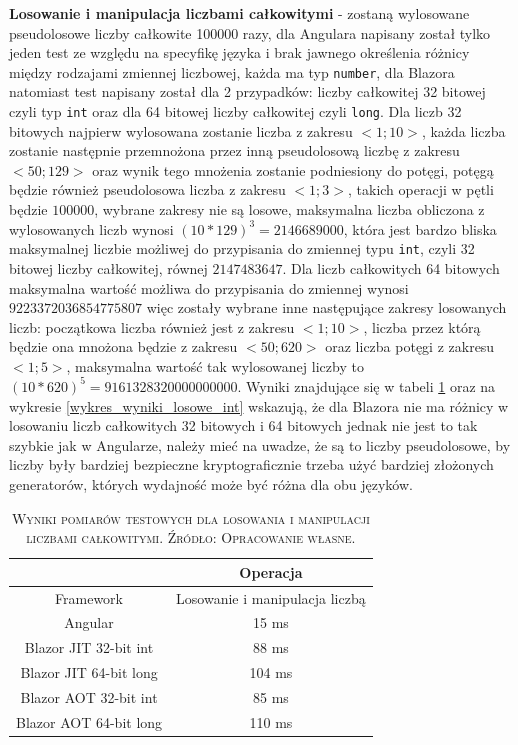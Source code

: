 \documentclass[12pt,a4paper,oneside]{book}
\newcommand{\captionT}[1]{\caption{\textsc{\footnotesize{#1}}}}
\begin{document}
\textbf{Losowanie i manipulacja liczbami całkowitymi} - zostaną wylosowane pseudolosowe liczby całkowite 100000 razy, dla Angulara napisany został tylko jeden test ze względu na specyfikę języka i brak jawnego określenia różnicy między rodzajami zmiennej liczbowej, każda ma typ \texttt{number}, dla Blazora natomiast test napisany został dla 2 przypadków: liczby całkowitej 32 bitowej czyli typ \texttt{int} oraz dla 64 bitowej liczby całkowitej czyli \texttt{long}. Dla liczb 32 bitowych najpierw wylosowana zostanie liczba z zakresu $<1; 10>$, każda liczba zostanie następnie przemnożona przez inną pseudolosową liczbę z zakresu $<50; 129>$ oraz wynik tego mnożenia zostanie podniesiony do potęgi, potęgą będzie również pseudolosowa liczba z zakresu $<1; 3>$, takich operacji w pętli będzie $100000$, wybrane zakresy nie są losowe, maksymalna liczba obliczona z wylosowanych liczb wynosi $(10 * 129) ^ 3 = 2146689000$, która jest bardzo bliska maksymalnej liczbie możliwej do przypisania do zmiennej typu \texttt{int}, czyli 32 bitowej liczby całkowitej, równej $2147483647$. Dla liczb całkowitych 64 bitowych maksymalna wartość możliwa do przypisania do zmiennej wynosi $9223372036854775807$ więc zostały wybrane inne następujące zakresy losowanych liczb: początkowa liczba również jest z zakresu $<1; 10>$, liczba przez którą będzie ona mnożona będzie z zakresu $<50; 620>$ oraz liczba potęgi z zakresu $<1; 5>$, maksymalna wartość tak wylosowanej liczby to $(10 * 620) ^ 5 = 9161328320000000000$. Wyniki znajdujące się w tabeli \ref{tab_wyniki_losowe_int} oraz na wykresie \ref{wykres_wyniki_losowe_int} wskazują, że dla Blazora nie ma różnicy w losowaniu liczb całkowitych 32 bitowych i 64 bitowych jednak nie jest to tak szybkie jak w Angularze, należy mieć na uwadze, że są to liczby pseudolosowe, by liczby były bardziej bezpieczne kryptograficznie trzeba użyć bardziej złożonych generatorów, których wydajność może być różna dla obu języków.

\begin{table}[!htp]
\centering
\captionT{Wyniki pomiarów testowych dla losowania i manipulacji liczbami całkowitymi. Źródło: Opracowanie własne.}
\begin{tabular}{ |c|c| }
 \hline
  & Operacja \\
 \hline
  Framework & Losowanie i manipulacja liczbą\\
 \hline
Angular & 15 ms\\
Blazor JIT 32-bit int & 88 ms\\
Blazor JIT 64-bit long & 104 ms\\
Blazor AOT 32-bit int & 85 ms\\
Blazor AOT 64-bit long & 110 ms\\

 \hline
\end{tabular}
\label{tab_wyniki_losowe_int}
\end{table}
\end{document}
